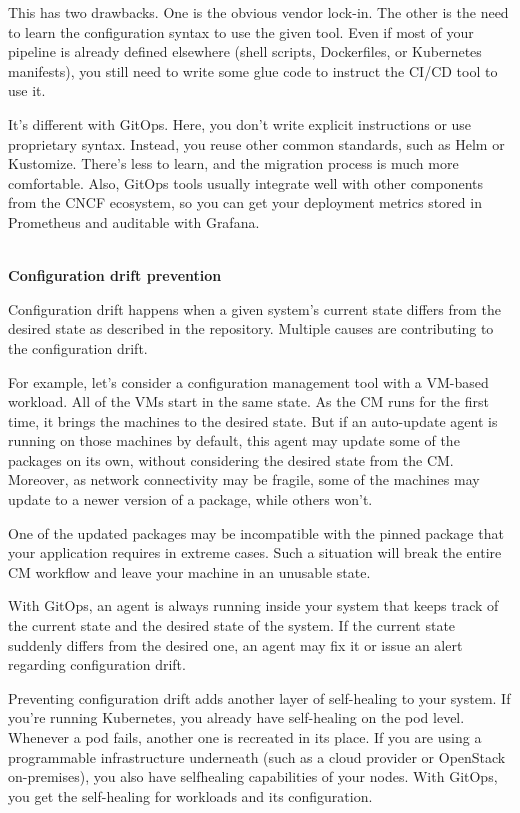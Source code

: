 This has two drawbacks. One is the obvious vendor lock-in. The other is the need to learn the configuration syntax to use the given tool. Even if most of your pipeline is already defined elsewhere (shell scripts, Dockerfiles, or Kubernetes  manifests), you still need to write some glue code to instruct the CI/CD tool to use it.

It's different with GitOps. Here, you don't write explicit instructions or use proprietary syntax. Instead, you reuse other common standards, such as Helm or Kustomize. There's less to learn, and the migration process is much more comfortable. Also, GitOps tools usually integrate well with other components from the CNCF ecosystem, so you can get your deployment metrics stored in Prometheus and auditable with Grafana.

\hspace*{\fill} \\ %
\noindent
\textbf{Configuration drift prevention}

Configuration drift happens when a given system's current state differs from the desired state as described in the repository. Multiple causes are contributing to the configuration drift.

For example, let's consider a configuration management tool with a VM-based workload. All of the VMs start in the same state. As the CM runs for the first time, it brings the machines to the desired state. But if an auto-update agent is running on those machines by default, this agent may update some of the packages on its own, without considering the desired state from the CM. Moreover, as network connectivity may be fragile, some of the machines may update to a newer version of a package, while others won't.

One of the updated packages may be incompatible with the pinned package that your application requires in extreme cases. Such a situation will break the entire CM workflow and leave your machine in an unusable state.

With GitOps, an agent is always running inside your system that keeps track of the current state and the desired state of the system. If the current state suddenly differs from the desired one, an agent may fix it or issue an alert regarding configuration drift.

Preventing configuration drift adds another layer of self-healing to your system. If you're running Kubernetes, you already have self-healing on the pod level. Whenever a pod fails, another one is recreated in its place. If you are using a programmable infrastructure underneath (such as a cloud provider or OpenStack on-premises), you also have selfhealing capabilities of your nodes. With GitOps, you get the self-healing for workloads and its configuration.

